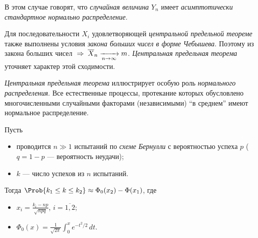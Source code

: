 \begin{rem}
	В этом случае говорят, что \emph{случайная величина} $Y_n$ имеет \emph{асимптотически стандартное нормально распределение}.
\end{rem}
\begin{rem}
	Для последовательности $X_i$ удовлетворяющей \emph{центральной предельной теореме} также выполнены условия \emph{закона больших чисел в форме Чебышева}. Поэтому из закона больших чисел $\;\Rightarrow\; \overline{X}_n \xrightarrow[n\to\infty]{} m$. \emph{Центральная предельная теорема} уточняет характер этой сходимости.
\end{rem}
\begin{rem}
	\emph{Центральная предельная теорема} иллюстрирует особую роль \emph{нормального распределения}. Все естественные процессы, протекание которых обусловлено многочисленными случайными факторами (независимыми) ``в среднем'' имеют нормальное распределение.
\end{rem}

\begin{thm}Пусть
	\begin{itemize}
		\item проводится $n \gg 1$ испытаний по \emph{схеме Бернулли} с вероятностью успеха $p$ ($q = 1 - p$ --- вероятность неудачи);
		\item $k$ --- число успехов из $n$ испытаний.
	\end{itemize}
	Тогда $\Prob \{ k_1 \leq k \leq k_2 \} \approx \Phi_0(x_2) - \Phi(x_1)$, где
	\begin{itemize}
		\item $x_i = \frac{k_i - np}{\sqrt{npq}}$, $i = \overline{1, 2}$;
		\item $\Phi_0(x) = \frac{1}{\sqrt{2\pi}} \int_{0}^{x} e^{-t^2/2}\, dt$.
	\end{itemize} 
\end{thm}